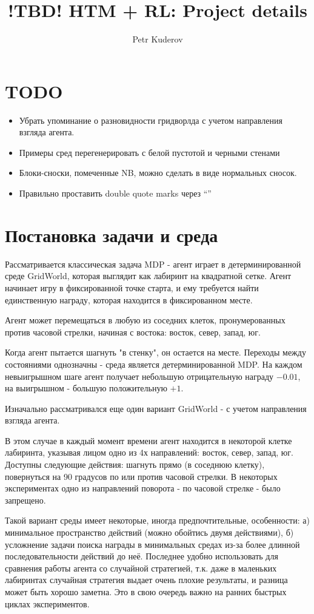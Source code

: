 \documentclass[a4paper]{article}
\begin{document}
\title {!TBD! HTM + RL: Project details}
\author {Petr Kuderov}
\maketitle

\section{TODO}

\begin{itemize}
  \item Убрать упоминание о разновидности гридворлда с учетом направления взгляда агента.
  \item Примеры сред перегенерировать с белой пустотой и черными стенами
  \item Блоки-сноски, помеченные NB, можно сделать в виде нормальных сносок.
  \item Правильно проставить double quote marks через ``''
\end{itemize}

\section {Постановка задачи и среда}

Рассматривается классическая задача MDP - агент играет в детерминированной среде GridWorld, которая выглядит как лабиринт на квадратной сетке. Агент начинает игру в фиксированной точке старта, и ему требуется найти единственную награду, которая находится в фиксированном месте.

Агент может перемещаться в любую из соседних клеток, пронумерованных против часовой стрелки, начиная с востока: восток, север, запад, юг.

Когда агент пытается шагнуть "в стенку", он остается на месте. Переходы между состояниями однозначны - среда является детерминированной MDP. На каждом невыигрышном шаге агент получает небольшую отрицательную награду $-0.01$, на выигрышном - большую положительную $+1$.

\begin{framed}
  Изначально рассматривался еще один вариант GridWorld - с учетом направления взгляда агента.

  В этом случае в каждый момент времени агент находится в некоторой клетке лабиринта, указывая лицом одно из 4х направлений: восток, север, запад, юг. Доступны следующие действия: шагнуть прямо (в соседнюю клетку), повернуться на 90 градусов по или против часовой стрелки. В некоторых экспериментах одно из направлений поворота - по часовой стрелке - было запрещено.

  Такой вариант среды имеет некоторые, иногда предпочтительные, особенности: а) минимальное пространство действий (можно обойтись двумя действиями), б) усложнение задачи поиска награды в минимальных средах из-за более длинной последовательности действий до неё. Последнее удобно использовать для сравнения работы агента со случайной стратегией, т.к. даже в маленьких лабиринтах случайная стратегия выдает очень плохие результаты, и разница может быть хорошо заметна. Это в свою очередь важно на ранних быстрых циклах экспериментов.
\end{framed}
\end{document}
